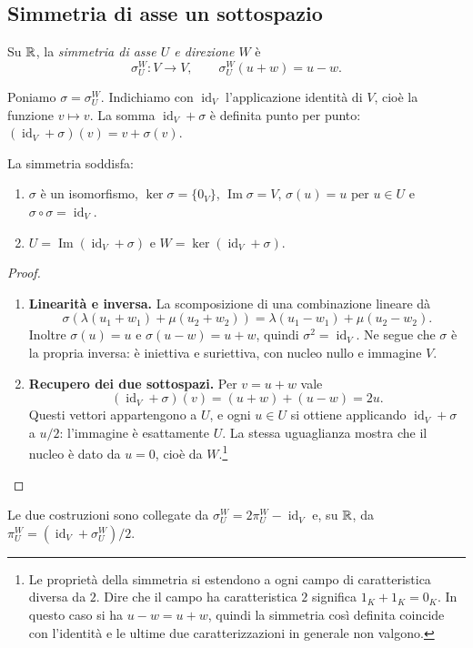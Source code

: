 \subsection{Simmetria di asse un sottospazio}
\begin{definizione}
Su $\mathbb{R}$, la \emph{simmetria di asse $U$ e direzione $W$} è
\[
 \sigma_U^W:V\longrightarrow V,\qquad \sigma_U^W(u+w)=u-w.
\]
\end{definizione}
\begin{schema}
\end{schema}
Poniamo $\sigma=\sigma_U^W$. Indichiamo con $\operatorname{id}_V$ l’applicazione identità di $V$, cioè la funzione $v\mapsto v$. La somma $\operatorname{id}_V+\sigma$ è definita punto per punto: $(\operatorname{id}_V+\sigma)(v)=v+\sigma(v)$.
\begin{proposizione}
La simmetria soddisfa:
\begin{enumerate}[label=\arabic*.]
\item $\sigma$ è un isomorfismo, $\ker\sigma=\{0_V\}$, $\operatorname{Im}\sigma=V$, $\sigma(u)=u$ per $u\in U$ e $\sigma\circ\sigma=\operatorname{id}_V$.
\item $U=\operatorname{Im}(\operatorname{id}_V+\sigma)$ e $W=\ker(\operatorname{id}_V+\sigma)$.
\end{enumerate}
\end{proposizione}
\begin{proof}
\begin{enumerate}[label=\arabic*.]
\item \textbf{Linearità e inversa.} La scomposizione di una combinazione lineare dà
\[
 \sigma(\lambda(u_1+w_1)+\mu(u_2+w_2))
 =\lambda(u_1-w_1)+\mu(u_2-w_2).
\]
Inoltre $\sigma(u)=u$ e $\sigma(u-w)=u+w$, quindi $\sigma^2=\operatorname{id}_V$. Ne segue che $\sigma$ è la propria inversa: è iniettiva e suriettiva, con nucleo nullo e immagine $V$.
\item \textbf{Recupero dei due sottospazi.} Per $v=u+w$ vale
\[
 (\operatorname{id}_V+\sigma)(v)=(u+w)+(u-w)=2u.
\]
Questi vettori appartengono a $U$, e ogni $u\in U$ si ottiene applicando $\operatorname{id}_V+\sigma$ a $u/2$: l'immagine è esattamente $U$. La stessa uguaglianza mostra che il nucleo è dato da $u=0$, cioè da $W$.\footnote{Le proprietà della simmetria si estendono a ogni campo di caratteristica diversa da $2$. Dire che il campo ha caratteristica $2$ significa $1_K+1_K=0_K$. In questo caso si ha $u-w=u+w$, quindi la simmetria così definita coincide con l'identità e le ultime due caratterizzazioni in generale non valgono.}
\end{enumerate}
\end{proof}
Le due costruzioni sono collegate da $\sigma_U^W=2\pi_U^W-\operatorname{id}_V$ e, su $\mathbb{R}$, da $\pi_U^W=(\operatorname{id}_V+\sigma_U^W)/2$.
